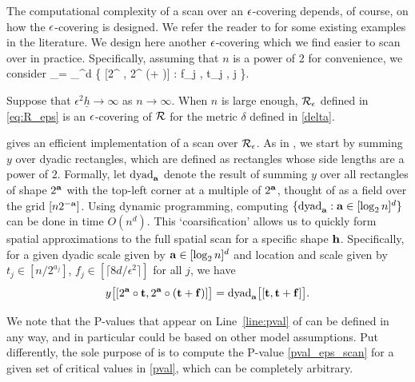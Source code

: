 \documentclass[twoside,11pt]{article}
\begin{document}
The computational complexity of a scan over an $\epsilon$-covering depends, of course, on how the $\epsilon$-covering is designed.
We refer the reader to \citep{MGD,cluster,MR2604703} for some existing examples in the literature.  
We design here another $\epsilon$-covering which we find easier to scan over in practice. 
Specifically, assuming that $n$ is a power of 2 for convenience, we consider
\beq \label{eq:R_eps}
\Rcal_\epsilon = \bigcup_{\ab \in [ \log_2 n  ]^d }\Big\{ [2^{\ab} \circ \tb, 2^{\ab} \circ (\tb + \fb)] : f_j , t_j \in [n / 2^{a_j}], \forall j \in [d]\Big\}. 
\eeq

\begin{proposition} \label{prop:eps-cover}
Suppose that $\epsilon^2 \underline h \rightarrow \infty$ as $n \to \infty$.
When $n$ is large enough, $\mathcal{R}_\epsilon$ defined in \eqref{eq:R_eps} is an $\epsilon$-covering of $\mathcal{R}$ for the metric $\delta$ defined in \eqref{delta}.
\end{proposition}




 gives an efficient implementation of a scan over $\mathcal{R}_\epsilon$.
As in \citep{MGD}, we start by summing $y$ over dyadic rectangles, which are defined as rectangles whose side lengths are a power of $2$.
Formally, let ${\rm dyad}_{\mathbf{a}}$ denote the result of summing $y$ over all rectangles of shape $2^{\mathbf{a}}$ with the top-left corner at a multiple of $2^{\mathbf{a}}$, thought of as a field over the grid $[n 2^{-\mathbf{a}}]$.
Using dynamic programming, computing $\{\textrm{dyad}_{\mathbf{a}} : \mathbf{a} \in [ \log_2 n  ]^d\}$ can be done in time $O(n^d)$.
This `coarsification' allows us to quickly form spatial approximations to the full spatial scan for a specific shape $\mathbf{h}$.
Specifically, for a given dyadic scale given by $\mathbf{a} \in [\log_2 n]^d$ and location and scale given by $t_j \in [n / 2^{a_j}]$, $f_j \in [\lceil 8d / \epsilon^2 \rceil]$ for all $j$, we have 
\[
y\big[[2^{\mathbf{a}} \circ \mathbf{t}, 2^{\mathbf{a}} \circ (\mathbf{t} + \mathbf{f})]\big] = \textrm{dyad}_{\mathbf{a}} \big[[\mathbf{t}, \mathbf{t}+\mathbf{f}] \big].
\]

We note that the P-values that appear on Line~\ref{line:pval} of  can be defined in any way, and in particular could be based on other model assumptions.  Put differently, the sole purpose of  is to compute the P-value \eqref{pval_eps_scan} for a given set of critical values in \eqref{pval}, which can be completely arbitrary.
\end{document}
